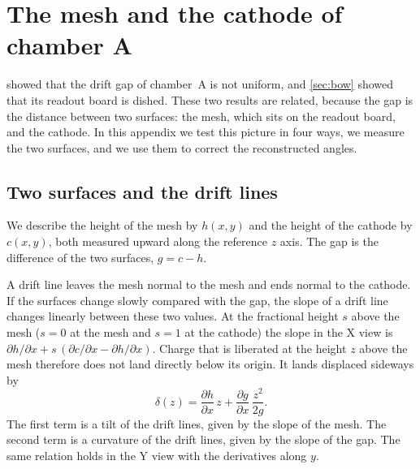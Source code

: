 \section{The mesh and the cathode of chamber A}\label{app:gapmap}

 showed that the drift gap of chamber~A is not uniform, and \cref{sec:bow} showed that its readout board
is dished. These two results are related, because the gap is the distance between two surfaces: the mesh, which sits
on the readout board, and the cathode. In this appendix we test this picture in four ways, we measure the two surfaces,
and we use them to correct the reconstructed angles.

\subsection{Two surfaces and the drift lines}
We describe the height of the mesh by $h(x,y)$ and the height of the cathode by $c(x,y)$, both measured upward along
the reference $z$ axis. The gap is the difference of the two surfaces, $g=c-h$.

A drift line leaves the mesh normal to the mesh and ends normal to the cathode. If the surfaces change slowly compared
with the gap, the slope of a drift line changes linearly between these two values. At the fractional height $s$ above
the mesh ($s=0$ at the mesh and $s=1$ at the cathode) the slope in the X view is
$\partial h/\partial x+s\,(\partial c/\partial x-\partial h/\partial x)$. Charge that is liberated at the height $z$
above the mesh therefore does not land directly below its origin. It lands displaced sideways by
\begin{equation}
  \delta(z)=\frac{\partial h}{\partial x}\,z+\frac{\partial g}{\partial x}\,\frac{z^2}{2g}.
  \label{eq:driftline}
\end{equation}
The first term is a tilt of the drift lines, given by the slope of the mesh. The second term is a curvature of the
drift lines, given by the slope of the gap. The same relation holds in the Y view with the derivatives along $y$.

